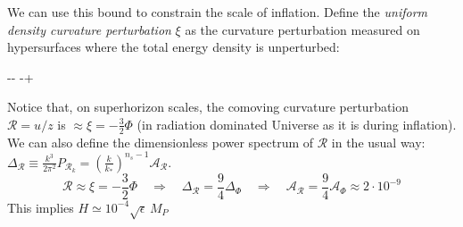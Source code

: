 We can use this bound to constrain the scale of inflation. Define the \textit{uniform density curvature perturbation} $\mathcal{\xi}$ as the curvature perturbation measured on hypersurfaces where the total energy density is unperturbed:
\begin{eqopt}[darkgreen]
    \equiv -\Phi - \delta \phi \qquad \mathcal{\xi} \equiv -\Phi +  
\end{eqopt}
Notice that, on superhorizon scales, the comoving curvature perturbation $\mathcal{R}=u/z$ is $\approx\mathcal{\xi}= -\frac{3}{2}\Phi$ (in radiation dominated Universe as it is during inflation).  
We can also define the dimensionless power spectrum of $\mathcal{R}$ in the usual way: $\Delta_{\mathcal{R}} \equiv \frac{k^3}{2\pi^2} P_{\mathcal{R}_k} =\left(\frac{k}{k_*}\right)^{n_s-1} \mathcal{A}_{\mathcal{R}}$.
\begin{equation}
    \mathcal{R} \approx \mathcal{\xi}= -\frac{3}{2}\Phi \quad \Rightarrow \quad \Delta_{\mathcal{R}} = \frac{9}{4} \Delta_{\Phi} \quad \Rightarrow \quad \mathcal{A}_{\mathcal{R}} = \frac{9}{4}  \mathcal{A}_\Phi \approx 2\cdot 10^{-9}
\end{equation}
This implies $H\simeq 10^{-4} \sqrt{\epsilon} \,M_P$